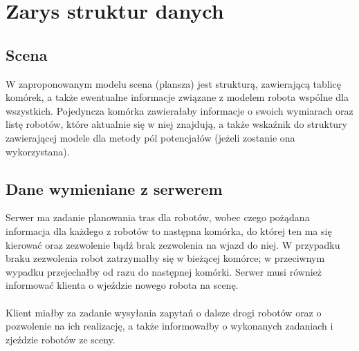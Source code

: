 
\section{Zarys struktur danych}
\subsection{Scena}
W zaproponowanym modelu scena (plansza) jest strukturą, zawierającą tablicę komórek, a także ewentualne informacje związane z modelem robota wspólne dla wszystkich. Pojedyncza komórka zawierałaby informacje o swoich wymiarach oraz listę robotów, które aktualnie się w niej znajdują, a także wskaźnik do struktury zawierającej modele dla metody pól potencjałów (jeżeli zostanie ona wykorzystana).
\subsection{Dane wymieniane z serwerem}
Serwer ma zadanie planowania tras dla robotów, wobec czego pożądana informacja dla każdego z robotów to następna komórka, do której ten ma się kierować oraz zezwolenie bądź brak zezwolenia na wjazd do niej. W przypadku braku zezwolenia robot zatrzymałby się w bieżącej komórce; w przeciwnym wypadku przejechałby od razu do następnej komórki. Serwer musi również informować klienta o wjeździe nowego robota na scenę.\\\\Klient miałby za zadanie wysyłania zapytań o dalsze drogi robotów oraz o pozwolenie na ich realizację, a także informowałby o wykonanych zadaniach i zjeździe robotów ze sceny.
